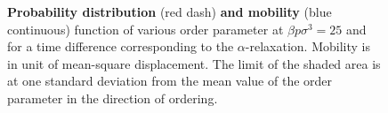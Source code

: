 \documentclass[twocolumn,superscriptaddress]{revtex4-1}
\begin{document}
\begin{figure}
	\caption{\textbf{Probability distribution} (red dash) \textbf{and mobility} (blue continuous) function of various order parameter at $\beta p\sigma^3=25$ and for a time difference corresponding to the $\alpha$-relaxation. Mobility is in unit of mean-square displacement. The limit of the shaded area is at one standard deviation from the mean value of the order parameter in the direction of ordering.}
	\label{fig:distrib}
\end{figure}
\end{document}
